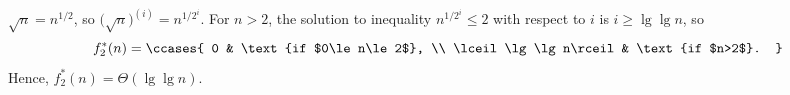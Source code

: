 $\sqrt{n}=n^{1/2}$, so $\bigl(\sqrt{n}\bigr)^{(i)}=n^{1/2^i}$.
For $n>2$, the solution to inequality $n^{1/2^i}\le2$ with respect to $i$ is $i\ge\lg\lg n$, so
\[
    f_2^*(n) =
    \ccases{
        0 & \text{if $0\le n\le2$}, \\
        \lceil\lg\lg n\rceil & \text{if $n>2$}.
    }
\]
Hence, $f_2^*(n)=\Theta(\lg\lg n)$.
